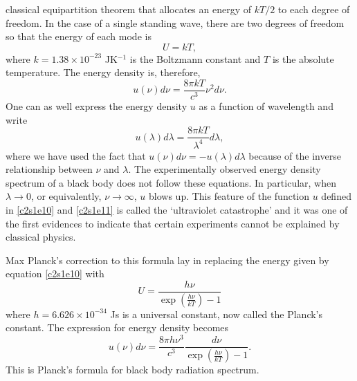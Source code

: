 classical equipartition theorem that allocates an energy of $kT/2$ to each
degree of freedom. In the case of a single standing wave, there are two degrees
of freedom so that the energy of each mode is
\begin{equation}\label{c2s1e10}
U = kT,
\end{equation}
where $k = 1.38 \times 10^{-23}$ JK${}^{-1}$ is the Boltzmann constant and $T$
is the absolute temperature. The energy density is, therefore,
\begin{equation}\label{c2s1e11}
u(\nu)d\nu = \frac{8\pi kT}{c^3}\nu^2 d\nu.
\end{equation}
One can as well express the energy density $u$ as a function of wavelength and
write
\begin{equation}\label{c2s1e12}
u(\lambda)d\lambda = \frac{8\pi kT}{\lambda^4}d\lambda,
\end{equation}
where we have used the fact that $u(\nu)d\nu = -u(\lambda)d\lambda$ because of
the inverse relationship between $\nu$ and $\lambda$.
The experimentally observed energy density spectrum of a black body does not
follow these equations. In particular, when $\lambda \rightarrow 0$, or 
equivalently, $\nu \rightarrow \infty$, $u$ blows up. This feature of the 
function $u$ defined in \eqref{c2s1e10} and \eqref{c2s1e11} is called the
`ultraviolet catastrophe' and it was one of the first evidences to indicate 
that certain experiments cannot be explained by classical physics.

Max Planck's correction to this formula lay in replacing the energy given by
equation \eqref{c2s1e10} with
\begin{equation}\label{c2s1e13}
U = \frac{h\nu}{\exp(\frac{h\nu}{kT}) - 1}
\end{equation}
where $h = 6.626 \times 10^{-34}$ Js is a universal constant, now called the
Planck's constant. The expression for energy density becomes
\begin{equation}\label{c2s1e14}
u(\nu)d\nu = \frac{8\pi h\nu^3}{c^3}\frac{d\nu}{\exp(\frac{h\nu}{kT}) - 1}.
\end{equation}
This is Planck's formula for black body radiation spectrum. 

